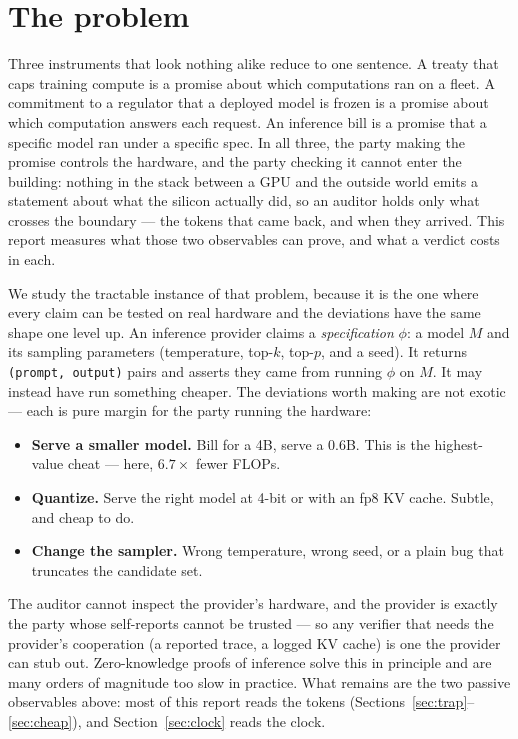 \documentclass[11pt]{article}
\begin{document}
\section{The problem}

Three instruments that look nothing alike reduce to one sentence. A treaty that
caps training compute is a promise about which computations ran on a fleet. A
commitment to a regulator that a deployed model is frozen is a promise about which
computation answers each request. An inference bill is a promise that a specific
model ran under a specific spec. In all three, the party making the promise
controls the hardware, and the party checking it cannot enter the building:
nothing in the stack between a GPU and the outside world emits a statement about
what the silicon actually did, so an auditor holds only what crosses the boundary
--- the tokens that came back, and when they arrived. This report measures what
those two observables can prove, and what a verdict costs in each.

We study the tractable instance of that problem, because it is the one where every
claim can be tested on real hardware and the deviations have the same shape one
level up. An inference provider claims a \emph{specification} $\phi$: a model $M$
and its sampling parameters (temperature, top-$k$, top-$p$, and a seed). It
returns \texttt{(prompt, output)} pairs and asserts they came from running $\phi$
on $M$. It may instead have run something cheaper. The deviations worth making are
not exotic --- each is pure margin for the party running the hardware:

\begin{itemize}
\item \textbf{Serve a smaller model.} Bill for a 4B, serve a 0.6B. This is the
      highest-value cheat --- here, $6.7\times$ fewer FLOPs.
\item \textbf{Quantize.} Serve the right model at 4-bit or with an fp8 KV cache.
      Subtle, and cheap to do.
\item \textbf{Change the sampler.} Wrong temperature, wrong seed, or a plain bug
      that truncates the candidate set.
\end{itemize}

The auditor cannot inspect the provider's hardware, and the provider is exactly
the party whose self-reports cannot be trusted --- so any verifier that needs the
provider's cooperation (a reported trace, a logged KV cache) is one the provider
can stub out. Zero-knowledge proofs of inference solve this in principle and are
many orders of magnitude too slow in practice. What remains are the two passive
observables above: most of this report reads the tokens
(Sections~\ref{sec:trap}--\ref{sec:cheap}), and Section~\ref{sec:clock} reads the
clock.
\end{document}
